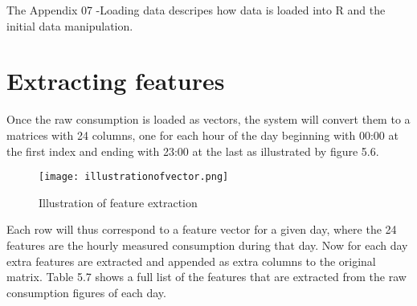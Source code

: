 The Appendix 07 -Loading data descripes how data is loaded into R and the initial data manipulation.

\section*{Extracting features}
Once the raw consumption is loaded as vectors, the system will convert them to a matrices with 24 columns, one for each hour of the day beginning with 00:00 at the first index and ending with 23:00 at the last as illustrated by figure 5.6. 
\begin{figure}
\texttt{[image: illustrationofvector.png]}
\caption{Illustration of feature extraction}
\end{figure}

Each row will thus correspond to a feature vector for a given day, where the 24 features are the hourly measured consumption during that day. Now for each day extra features are extracted and appended as extra columns to the original matrix. Table 5.7 shows a full list of the features that are extracted from the raw consumption figures of each day. 
